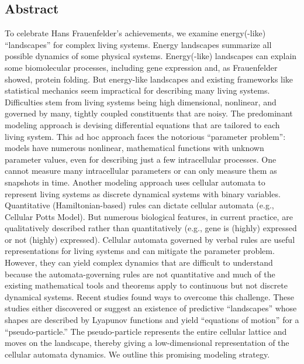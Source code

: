 \documentclass[11pt,a4paper]{article}
\begin{document}
\subsection*{Abstract}
To celebrate Hans Frauenfelder’s achievements, we examine energy(-like) “landscapes” for complex living systems. Energy landscapes summarize all possible dynamics of some physical systems. Energy(-like) landscapes can explain some biomolecular processes, including gene expression and, as Frauenfelder showed, protein folding. But energy-like landscapes and existing frameworks like statistical mechanics seem impractical for describing many living systems. Difficulties stem from living systems being high dimensional, nonlinear, and governed by many, tightly coupled constituents that are noisy. The predominant modeling approach is devising differential equations that are tailored to each living system. This ad hoc approach faces the notorious “parameter problem”: models have numerous nonlinear, mathematical functions with unknown parameter values, even for describing just a few intracellular processes. One cannot measure many intracellular parameters or can only measure them as snapshots in time. Another modeling approach uses cellular automata to represent living systems as discrete dynamical systems with binary variables. Quantitative (Hamiltonian-based) rules can dictate cellular automata (e.g., Cellular Potts Model). But numerous biological features, in current practice, are qualitatively described rather than quantitatively (e.g., gene is (highly) expressed or not (highly) expressed). Cellular automata governed by verbal rules are useful representations for living systems and can mitigate the parameter problem. However, they can yield complex dynamics that are difficult to understand because the automata-governing rules are not quantitative and much of the existing mathematical tools and theorems apply to continuous but not discrete dynamical systems. Recent studies found ways to overcome this challenge. These studies either discovered or suggest an existence of predictive “landscapes” whose shapes are described by Lyapunov functions and yield “equations of motion” for a “pseudo-particle.” The pseudo-particle represents the entire cellular lattice and moves on the landscape, thereby giving a low-dimensional representation of the cellular automata dynamics. We outline this promising modeling strategy.
\end{document}
